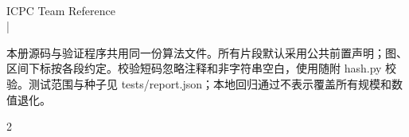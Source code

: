 \begin{center}
  {\Large\bfseries\blteam}\\[2mm]
  {\large ICPC Team Reference}\\[1mm]
  \blstandard\quad |\quad \bldate
\end{center}
\noindent 本册源码与验证程序共用同一份算法文件。所有片段默认采用公共前置声明；图、区间下标按各段约定。校验短码忽略注释和非字符串空白，使用随附 hash.py 校验。测试范围与种子见 tests/report.json；本地回归通过不表示覆盖所有规模和数值退化。\par\medskip
{\fontsize{8}{8.3}\selectfont
  \begin{multicols}{2}
    \tableofcontents
  \end{multicols}
}
\clearpage
